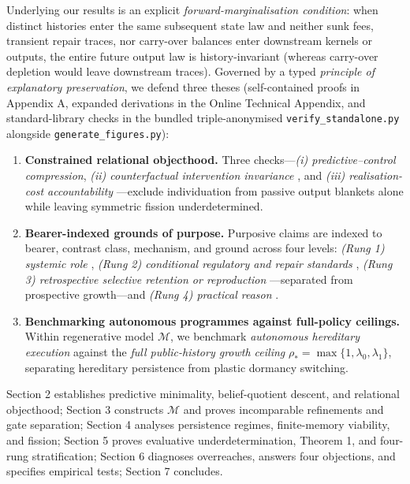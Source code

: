 \documentclass[12pt,letterpaper]{article}
\providecommand{\tightlist}{\setlength{\itemsep}{2pt}\setlength{\parskip}{0pt}}
\begin{document}
Underlying our results is an explicit \emph{forward-marginalisation
condition}: when distinct histories enter the same subsequent state law
and neither sunk fees, transient repair traces, nor carry-over balances
enter downstream kernels or outputs, the entire future output law is
history-invariant (whereas carry-over depletion would leave downstream
traces). Governed by a typed \emph{principle of explanatory
preservation}, we defend three theses (self-contained proofs in Appendix
A, expanded derivations in the Online Technical Appendix, and
standard-library checks in the bundled triple-anonymised
\texttt{verify\_standalone.py} alongside \texttt{generate\_figures.py}):

\begin{enumerate}
\def\labelenumi{\arabic{enumi}.}
\tightlist
\item
  \textbf{Constrained relational objecthood.} Three checks---\emph{(i)
  predictive--control compression}, \emph{(ii) counterfactual
  intervention invariance}
  \citep{hacking1983, woodward2003, craver2007}, and \emph{(iii)
  realisation-cost accountability}
  \citep{jonas1966, rosen1991, montevilMossio2015}---exclude
  individuation from passive output blankets alone while leaving
  symmetric fission underdetermined.
\item
  \textbf{Bearer-indexed grounds of purpose.} Purposive claims are
  indexed to bearer, contrast class, mechanism, and ground across four
  levels: \emph{(Rung 1) systemic role} \citep{cummins1975}, \emph{(Rung
  2) conditional regulatory and repair standards}
  \citep{rosenblueth1943, mossio2009, diPaolo2005, bich2024},
  \emph{(Rung 3) retrospective selective retention or reproduction}
  \citep{wright1973, millikan1984, godfreySmith1994, garson2019}---separated
  from prospective growth---and \emph{(Rung 4) practical reason}
  \citep{korsgaard1996, scanlon1998, street2006}.
\item
  \textbf{Benchmarking autonomous programmes against full-policy
  ceilings.} Within regenerative model \(\mathcal{M}\), we benchmark
  \emph{autonomous hereditary execution} against the \emph{full
  public-history growth ceiling}
  \(\rho_* = \max\{1, \lambda_0, \lambda_1\}\), separating hereditary
  persistence from plastic dormancy switching.
\end{enumerate}

Section 2 establishes predictive minimality, belief-quotient descent,
and relational objecthood; Section 3 constructs \(\mathcal{M}\) and
proves incomparable refinements and gate separation; Section 4 analyses
persistence regimes, finite-memory viability, and fission; Section 5
proves evaluative underdetermination, Theorem 1, and four-rung
stratification; Section 6 diagnoses overreaches, answers four
objections, and specifies empirical tests; Section 7 concludes.
\end{document}
